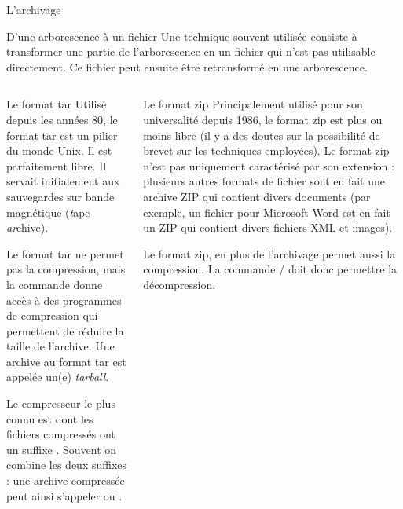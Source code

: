 \begin{frame}{L'archivage}
  \begin{block}{D'une arborescence à un fichier}
    Une technique souvent utilisée consiste à transformer une partie de
    l'arborescence en un fichier qui n'est pas utilisable directement. Ce
    fichier peut ensuite être retransformé en une arborescence.
  \end{block}
  \begin{columns}
    \begin{column}{55mm}
      \begin{block}{Le format tar}
        Utilisé depuis les années 80, le format tar est un pilier du
        monde Unix. Il est parfaitement libre. Il servait initialement
        aux sauvegardes sur bande magnétique (\emph{t}ape
        \emph{ar}chive).
        
        Le format tar ne permet pas la compression, mais la commande
         donne accès à des programmes de compression qui
        permettent de réduire la taille de l'archive. Une archive au
        format tar est appelée un(e) \emph{tarball}.

        Le compresseur le plus connu est  dont les fichiers
        compressés ont un suffixe . Souvent on combine les deux
        suffixes : une archive compressée peut ainsi s'appeler
         ou .
      \end{block}
    \end{column}
    \begin{column}{55mm}
      \begin{block}{Le format zip}
        Principalement utilisé pour son universalité depuis 1986, le format zip est
        plus ou moins libre (il y a des doutes sur la possibilité de
        brevet sur les techniques employées). Le format zip n'est pas
        uniquement caractérisé par son extension : plusieurs autres
        formats de fichier sont en fait une archive ZIP qui contient
        divers documents (par exemple, un fichier  pour
        Microsoft Word est en fait un ZIP qui contient divers fichiers
        XML et images).

        Le format zip, en plus de l'archivage permet aussi la
        compression. La commande / doit donc
        permettre la décompression.
      \end{block}
    \end{column}
  \end{columns}
\end{frame}

